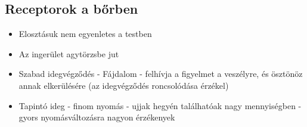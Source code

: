 \documentclass{article}
\begin{document}
\subsection{Receptorok a bőrben}
\begin{itemize}
    \item Elosztásuk nem egyenletes a testben
    \item Az ingerület agytörzsbe jut
    \item Szabad idegvégződés - Fájdalom - felhívja a figyelmet a veszélyre, és ösztönöz annak elkerülésére (az idegvégződés roncsolódása érzékel)
    \item Tapintó ideg - finom nyomás - ujjak hegyén találhatóak nagy mennyiségben - gyors nyomásváltozásra nagyon érzékenyek
\end{itemize}
\end{document}
